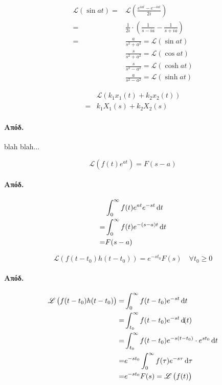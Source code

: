\documentclass[11pt,a4paper,titlepage,final]{article}
\begin{document}
\paragraph{}
\begin{align*}
\mathscr L(\sin at)  =& \mathscr{L}
\left(
\frac{e^{iat}-e^{-iat}}{2i}
\right)
\\=&
\frac{1}{2i}\cdot\left(
\frac{1}{s-ia}-\frac{1}{s+ia}
\right)
\\=&\frac{a}{s^2+a^2} = \mathscr{L}(\sin at)
\\&\frac{s}{s^2+a^2}=\mathscr{L}(\cos at)
\\&\frac{s}{s^2-a^2}=\mathscr{L}(\cosh at)
\\&\frac{a}{s^2-a^2}=\mathscr{L}(\sinh at)
\end{align*}

\begin{theorem*}{}
\begin{align*}
&\mathscr{L}\left(
k_1x_1(t)+k_2x_2(t)
\right)\\
=&k_1X_1(s)+k_2X_2(s)
\end{align*}
\end{theorem*}
\paragraph{Απόδ.}
\textlatin{blah blah...}

\begin{theorem*}{}
\[
\mathscr{L}\left(
f(t)e^{at}
\right) = F(s-a)
\]
\end{theorem*}
\paragraph{Απόδ.}
\begin{align*}
&\int_0^\infty f(t)e^{at}e^{-st}\dif t
\\=&
\int_0^\infty f(t)e^{-(s-a)t} \dif t
\\=&
F(s-a)
\end{align*}

\begin{theorem*}{}
\[
\mathscr{L}\left(
f(t-t_0)h(t-t_0)
\right)=e^{-st_0}F(s) \quad \forall t_0 \geq 0
\]
\end{theorem*}
\paragraph{Απόδ.}
\begin{align*}
\mathscr{L}\left(
f(t-t_0)h(t-t_0)\right) =&
\int_0^\infty f(t-t_0)e^{-st} \dif t
\\=&
\int_{t_0}^\infty f(t-t_0)e^{-st} \dif(t)
\\=&
\int_{t_0}^\infty f(t-t_0)e^{-s(t-t_0)}\cdot e^{st_0}\dif t
\\=&
e^{-st_0} \int_0^\infty f(\tau) e^{-s\tau} \dif \tau 
\\=&
e^{-st_0} F(s) = \mathscr{L}\left(f(t)\right)
\end{align*}
\end{document}
